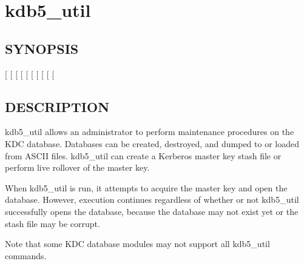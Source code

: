 \documentclass[letterpaper,10pt,english]{sphinxmanual}
\begin{document}
\sphinxstepscope


\section{kdb5\_util}
\label{\detokenize{admin/admin_commands/kdb5_util:kdb5-util}}\label{\detokenize{admin/admin_commands/kdb5_util:kdb5-util-8}}\label{\detokenize{admin/admin_commands/kdb5_util::doc}}

\subsection{SYNOPSIS}
\label{\detokenize{admin/admin_commands/kdb5_util:synopsis}}\label{\detokenize{admin/admin_commands/kdb5_util:kdb5-util-synopsis}}
\sphinxAtStartPar
{}
{[} \sphinxstyleemphasis{realm}{]}
{[} \sphinxstyleemphasis{dbname}{]}
{[} \sphinxstyleemphasis{mkeytype}{]}
{[} \sphinxstyleemphasis{mkeyVNO}{]}
{[} \sphinxstyleemphasis{mkeyname}{]}
{[}\sphinxstylestrong{\sphinxhyphen{}m}{]}
{[} \sphinxstyleemphasis{stashfilename}{]}
{[} \sphinxstyleemphasis{password}{]}
{[} \sphinxstyleemphasis{db\_args}{]}
 {[}\sphinxstyleemphasis{command\_options}{]}


\subsection{DESCRIPTION}
\label{\detokenize{admin/admin_commands/kdb5_util:description}}\label{\detokenize{admin/admin_commands/kdb5_util:kdb5-util-synopsis-end}}
\sphinxAtStartPar
kdb5\_util allows an administrator to perform maintenance procedures on
the KDC database.  Databases can be created, destroyed, and dumped to
or loaded from ASCII files.  kdb5\_util can create a Kerberos master
key stash file or perform live rollover of the master key.

\sphinxAtStartPar
When kdb5\_util is run, it attempts to acquire the master key and open
the database.  However, execution continues regardless of whether or
not kdb5\_util successfully opens the database, because the database
may not exist yet or the stash file may be corrupt.

\sphinxAtStartPar
Note that some KDC database modules may not support all kdb5\_util
commands.
\end{document}

